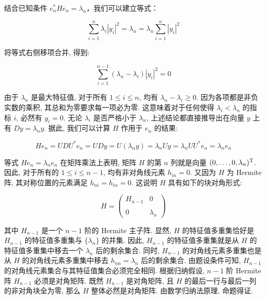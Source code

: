 \begin{enumerate}
结合已知条件 \(e_n^* He_n = \lambda_n\)，我们可以建立等式：

\[\sum_{i=1}^{n} \lambda_{i} |y_{i}|^{2} = \lambda_{n} 
= \lambda_{n} \sum_{i=1}^{n} |y_{i}|^{2}\]

将等式右侧移项合并, 得到:

\[\sum_{i=1}^ {n-1} (\lambda_{n} - \lambda_{i}) |y_{i}|^{2} = 0\]

由于 \(\lambda_{n}\) 是最大特征值, 对于所有 \(1 \leqslant i \leqslant n\), 
均有 \(\lambda_{n} - \lambda_{i} \geq 0\). 
因为各项都是非负实数的乘积, 其总和为零要求每一项必为零. 
这意味着对于任何使得 \(\lambda_{i} < \lambda_{n}\) 的指标 \(i\), 
必然有 \(y_{i} = 0\). 无论 \(\lambda_{i}\) 是否严格小于 \(\lambda_{n}\),
上述结论都直接推导出在向量 \(y\) 上有 \(Dy = \lambda_{n}y\). 
据此, 我们可以计算 \(H\) 作用于 \(e_{n}\) 的结果:

\[H e_{n} = U D U ^ {*} e_{n} = U D y = U (\lambda_{n} y) 
= \lambda_{n} U y = \lambda_ {n} U U ^ {*} e_{n} = \lambda_{n} e_{n}\]

等式 \(He_{n} = \lambda_{n}e_{n}\) 在矩阵乘法上表明, 
矩阵 \(H\) 的第 \(n\) 列就是向量 \((0,\dots,0,\lambda_{n})^{\rm T}\). 
因此, 对于所有的 \(1 \leqslant i \leqslant n-1\), 均有非对角线元素 \(h_{in} = 0\). 
又因为 \(H\) 为 Hermite 阵, 其对称位置的元素满足 \(h_{ni} = \overline{h_{in}} = 0\).
这说明 \(H\) 具有如下的块对角形式:

\[H = \begin{pmatrix} H_{n-1} & 0 \\ \\ 0 & \lambda_{n} \end{pmatrix}\]

其中 \(H_{n-1}\) 是一个 $n-1$ 阶的 Hermite 主子阵. 
显然, $H$ 的特征值多重集恰好是 \(H_{n-1}\) 的特征值多重集与 \(\{\lambda_{n}\}\) 的并集. 
因此, \(H_{n-1}\) 的特征值多重集就是从 $H$ 的特征值多重集中移去一个 \(\lambda_{n}\) 后的剩余集合. 
同时, \(H_{n-1}\) 的对角线元素多重集也是从 \(H\) 的对角线元素多重集中移去 \(h_{nn} = \lambda_n\) 后的剩余集合. 
由题设条件可知, \(H_{n-1}\) 的对角线元素集合与其特征值集合必须完全相同. 
根据归纳假设, \(n-1\) 阶 Hermite 阵 \(H_{n-1}\) 必须是对角矩阵. 
既然 \(H_{n-1}\) 是对角矩阵, 且 \(H\) 的最后一行与最后一列的非对角块全为零, 
那么 \(H\) 整体必然是对角矩阵. 由数学归纳法原理, 命题得证.
\end{enumerate}